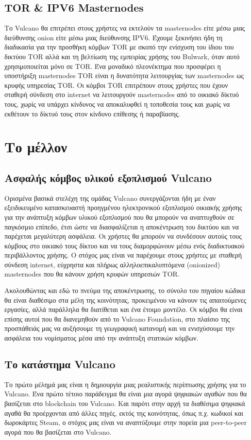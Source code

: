 \documentclass[A4paper, 12pt]{article}
\begin{document}
\subsection{TOR \& IPV6 Masternodes}
Το Vulcano θα επιτρέπει στους χρήστες να εκτελούν τα masternodes είτε μέσω μιας διεύθυνσης onion είτε μέσω μιας διεύθυνσης IPV6. Έχουμε ξεκινήσει ήδη τη διαδικασία για την προσθήκη κόμβων TOR με σκοπό την ενίσχυση του ίδιου του δικτύου TOR αλλά και τη βελτίωση της εμπειρίας χρήσης του Bulwark, όταν αυτό χρησιμοποιείται μόνο σε TOR. Ένα μοναδικό πλεονέκτημα που προσφέρει η υποστήριξη masternodes TOR είναι η δυνατότητα λειτουργίας των masternodes ως κρυφής υπηρεσίας TOR. Οι κόμβοι TOR επιτρέπουν στους χρήστες που έχουν σταθερή σύνδεση στο internet να λειτουργούν masternodes από το οικιακό δίκτυό τους, χωρίς να υπάρχει κίνδυνος να αποκαλυφθεί η τοποθεσία τους και χωρίς να εκθέτουν το δίκτυό τους στον κίνδυνο επίθεσης ή παραβίασης.
 
\section{Το μέλλον}
\subsection{Ασφαλής κόμβος υλικού εξοπλισμού Vulcano}
Ορισμένα βασικά στελέχη της ομάδας Vulcano συνεργάζονται ήδη με έναν εξειδικευμένο κατασκευαστή προηγμένου ηλεκτρονικού εξοπλισμού οικιακής χρήσης για την ανάπτυξη κόμβων υλικού εξοπλισμού που θα μπορούν να αναπτυχθούν σε παγκόσμιο επίπεδο, έτσι ώστε να διασφαλίζεται η αποκέντρωση του δικτύου και να παρέχεται μεγαλύτερη ασφάλεια. Οι χρήστες θα μπορούν να συνδέσουν αυτούς τους κόμβους στο οικιακό τους δίκτυο και να τους διαμορφώνουν μέσω ενός διαδικτυακού περιβάλλοντος χρήσης. Ο στόχος μας είναι να παρέχουμε στους χρήστες με σταθερή σύνδεση internet, εύχρηστα και πλήρως αλληλοεπικαλυπτόμενα (onionized) masternodes που θα κάνουν χρήση κρυφών υπηρεσιών TOR.

Ακολουθώντας και εδώ το πνεύμα της αποκέντρωσης, το σύνολο του πηγαίου κώδικα θα είναι διαθέσιμο στα μέλη της κοινότητας, προκειμένου να κάνουν τις απαιτούμενες εργασίες, αλλά παράλληλα θα διατίθεται και ένα έτοιμο μοντέλο. Οι κόμβοι θα είναι επίσης αυτοί που θα διανεμηθούν από το Vulcano Foundation, στο πλαίσιο της προσπάθειάς μας να αυξήσουμε τη γεωγραφική κατανομή και να ενισχύσουμε την ασφάλεια του νομίσματος μέσα από την ανάπτυξη στατικών κόμβων.

\subsection{	Το κατάστημα Vulcano}
Το πρώτο μέλημά μας είναι η δημιουργία μιας ρεαλιστικής περίπτωσης χρήσης για το Vulcano. Ένα πρώτο τέτοιο παράδειγμα θα είναι μια αγορά ψηφιακών αγαθών που θα βασίζεται στο blockchain του Vulcano. Και παρότι στην αρχή τα διαθέσιμα ψηφιακά αγαθά θα προέρχονται από άλλες πηγές, εκτός της κοινότητας, όπως π.χ. κωδικοί και δωροκάρτες Steam, ο στόχος μας είναι να αναπτύξουμε στην πορεία μια peer-to-peer αγορά που θα βασίζεται στο Vulcano.
\end{document}
